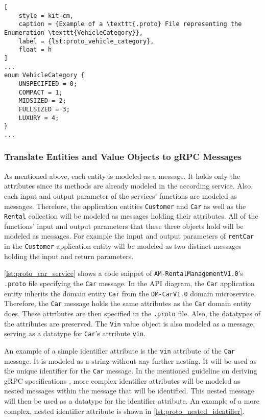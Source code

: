 \begin{lstlisting}[
    style = kit-cm,
    caption = {Example of a \texttt{.proto} File representing the Enumeration \texttt{VehicleCategory}},
    label = {lst:proto_vehicle_category},
    float = h
]
...
enum VehicleCategory {
    UNSPECIFIED = 0;
    COMPACT = 1;
    MIDSIZED = 2;
    FULLSIZED = 3;
    LUXURY = 4;
}
...
\end{lstlisting}
\subsubsection*{Translate Entities and Value Objects to gRPC Messages}
As mentioned above, each entity is modeled as a message.
It holds only the attributes since its methods are already modeled in the according service.
Also, each input and output parameter of the services' functions are modeled as messages.
Therefore, the application entities \texttt{Customer} and \texttt{Car} as well as the \texttt{Rental} collection will be modeled as messages holding their attributes.
All of the functions' input and output parameters that these three objects hold will be modeled as messages.
For example the input and output parameters of \texttt{rentCar} in the \texttt{Customer} application entity will be modeled as two distinct messages holding the input and return parameters.

\autoref{lst:proto_car_service} shows a code snippet of \texttt{AM-RentalManagementV1.0}'s \texttt{.proto} file specifying the \texttt{Car} message.
In the API diagram, the \texttt{Car} application entity inherits the domain entity \texttt{Car} from the \texttt{DM-CarV1.0} domain microservice.
Therefore, the \texttt{Car} message holds the same attributes as the \texttt{Car} domain entity does.
These attributes are then specified in the \texttt{.proto} file.
Also, the datatypes of the attributes are preserved.
The \texttt{Vin} value object is also modeled as a message, serving as a datatype for \texttt{Car}'s attribute \texttt{vin}.

An example of a simple identifier attribute is the \texttt{vin} attribute of the \texttt{Car} message.
It is modeled as a string without any further nesting.
It will be used as the unique identifier for the \texttt{Car} message.
In the mentioned guideline on deriving gRPC specifications \cite{CM-G-RPC}, more complex identifier attributes will be modeled as nested messages within the message that will be identified.
This nested message will then be used as a datatype for the identifier attribute.
An example of a more complex, nested identifier attribute is shown in \autoref{lst:proto_nested_identifier}.

